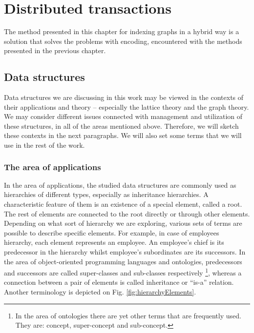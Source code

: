 \chapter{Distributed transactions}\label{chapter:distributedTransactions}

The method presented in this chapter for indexing graphs in a hybrid way is a solution that solves the problems with
encoding, encountered with the methods presented in the previous chapter.  

\section{Data structures}\label{sec:basics:dataStructures}

Data structures we are discussing in this work may be viewed in the contexts of their applications and theory --
especially the lattice theory and the graph theory. We may consider different issues connected with management and
utilization of these structures, in all of the areas mentioned above. Therefore, we will sketch these contexts in the
next paragraphs. We will also set some terms that we will use in the rest of the work.

\subsection{The area of applications}
In the area of applications, the studied data structures are commonly used as hierarchies of different types, especially
as inheritance hierarchies. A characteristic feature of them is an existence of a special element, called a root. The
rest of elements are connected to the root directly or through other elements. Depending on what sort of hierarchy we
are exploring, various sets of terms are possible to describe specific elements. For example, in case of employees
hierarchy, each element represents an employee. An employee's chief is its predecessor in the hierarchy whilst
employee's subordinates are its successors. In the area of object-oriented programming languages and ontologies,
predecessors and successors are called super-classes and sub-classes respectively \footnote{In the area of ontologies
there are yet other terms that are frequently used. They are: concept, super-concept and sub-concept.}, whereas a
connection between a pair of elements is called inheritance or ``is-a'' relation. Another terminology is  depicted on
Fig. \ref{fig:hierarchyElements}. \cite{CassandraDataStaxDocs} \cite{chandra2007PaxosMadeLive} \cite{lamport1982byzantine}